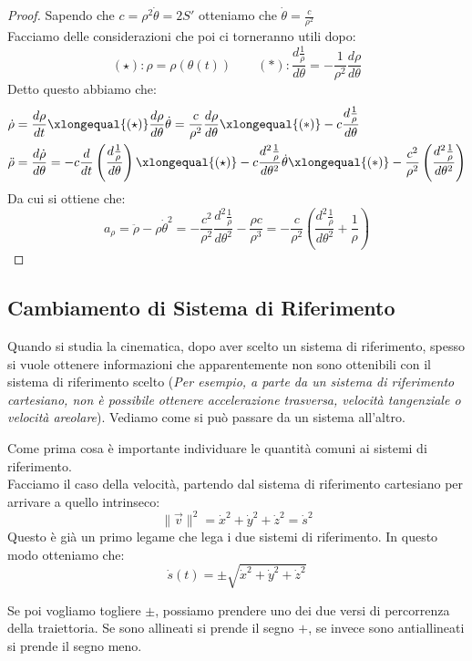 \documentclass[11pt,a4paper,twoside]{article}
\theoremstyle{definition}
\begin{document}
\begin{proof}
	Sapendo che $c = \rho^2 \dot \theta = 2S'$ otteniamo che $\dot \theta = \frac c{\rho^2}$\\
	Facciamo delle considerazioni che poi ci torneranno utili dopo:
	\[ (\star): \rho = \rho(\theta(t)) \qquad (*): \frac{d \frac 1\rho}{d\theta} = -\frac 1{\rho^2} \frac{d	\rho}{d\theta}\]
	Detto questo abbiamo che:
	\begin{align*}
		\dot \rho &= \frac{d\rho}{dt} \xlongequal{(\star)} \frac{d\rho}{d \theta} \dot \theta = \frac c{\rho^2} \frac{d\rho}{d \theta} \xlongequal{(*)} -c \frac{d \frac 1 \rho}{d \theta}\\
		\ddot \rho &= \frac{d \dot \rho}{d \theta} = -c \frac d{dt} \left( \frac{d \frac 1 \rho}{d \theta} \right) \xlongequal{(\star)} -c \frac{d^2 \frac 1 \rho}{ d \theta^2} \dot \theta \xlongequal{(*)} -\frac{c^2}{\rho^2} \left( \frac{d^2 \frac 1 \rho}{d \theta^2} \right)
	\end{align*}
	Da cui si ottiene che:
	\[a_\rho = \ddot \rho - \rho \dot\theta^2 = -\frac{c^2}{\rho^2} \frac{d^2 \frac 1 \rho}{ d \theta^2} - \frac{\rho c}{\rho^3} = -\frac{c}{\rho^2} \left( \frac{d^2 \frac 1 \rho}{d \theta^2} + \frac 1 \rho \right)\]
\end{proof}

\subsection{Cambiamento di Sistema di Riferimento}

Quando si studia la cinematica, dopo aver scelto un sistema di riferimento, spesso si vuole ottenere informazioni che apparentemente non sono ottenibili con il sistema di riferimento scelto (\textit{Per esempio, a parte da un sistema di riferimento cartesiano, non è possibile ottenere accelerazione trasversa, velocità tangenziale o velocità areolare}).
Vediamo come si può passare da un sistema all'altro.

Come prima cosa è importante individuare le quantità comuni ai sistemi di riferimento.\\
Facciamo il caso della velocità, partendo dal sistema di riferimento cartesiano per arrivare a quello intrinseco:
\[ \|\vec v\|^2 = \dot x^2 + \dot y^2 + \dot z^2 = \dot s^2 \]
Questo è già un primo legame che lega i due sistemi di riferimento. In questo modo otteniamo che:
\[ \dot s(t) = \pm \sqrt{\dot x^2 + \dot y^2 + \dot z^2} \]

Se poi vogliamo togliere $\pm$, possiamo prendere uno dei due versi di percorrenza della traiettoria. Se sono allineati si prende il segno $+$, se invece sono antiallineati si prende il segno meno.
\end{document}
